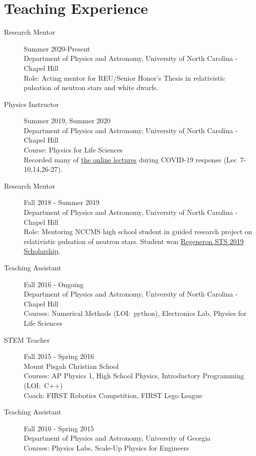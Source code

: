 \documentclass[11pt]{article}
\begin{document}
\section*{Teaching Experience}
\begin{minipage}{\textwidth}
	\begin{description}
		\item[Research Mentor] Summer 2020-Present\\
		Department of Physics and Astronomy, University of North Carolina - Chapel Hill \\
		Role: Acting mentor for REU/Senior Honor's Thesis in relativistic pulsation of neutron stars and white dwarfs.
		\item[Physics Instructor] Summer 2019, Summer 2020\\
			Department of Physics and Astronomy, University of North Carolina - Chapel Hill \\
			Course: Physics for Life Sciences\\
			Recorded many of \href{https://www.youtube.com/playlist?list=PLGw8-QpmEugz6IxX75R1kvd9NM_53pQXV}{the online lectures} during COVID-19 response (Lec~7-10,14,26-27).
		\item[Research Mentor] Fall 2018 - Summer 2019\\
		Department of Physics and Astronomy, University of North Carolina - Chapel Hill \\
			Role: Mentoring NCCMS high school student in guided research project on relativistic pulsation of neutron stars.  Student won \href{https://www.societyforscience.org/regeneron-sts/science-talent-search-2019/}{Regeneron STS 2019 Scholarship}.
		\item[Teaching Assistant] Fall 2016 - Ongoing\\
			Department of Physics and Astronomy, University of North Carolina - Chapel Hill\\
			Courses: Numerical Methods (LOI:~python), Electronics Lab, Physics for Life Sciences
		\item[STEM Teacher] Fall 2015 - Spring 2016\\
			Mount Pisgah Christian School\\
			Courses: AP Physics 1, High School Physics, Introductory Programming (LOI:~C++)\\
			Coach: FIRST Robotics Competition, FIRST Lego League
		\item[Teaching Assistant] Fall 2010 - Spring 2015\\
			Department of Physics and Astronomy, University of Georgia\\
			Courses: Physics Labs, Scale-Up Physics for Engineers
	\end{description}
\end{minipage}
\end{document}
